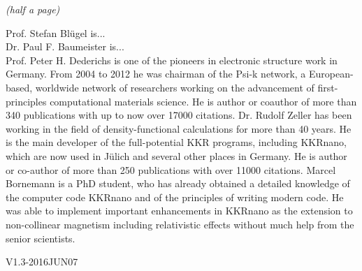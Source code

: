 \documentclass [a4paper, 12pt]{article}
\begin{document}
\textit{(half a page)}

Prof. Stefan Bl{\"u}gel is...
\\
Dr. Paul F. Baumeister is...
\\
Prof. Peter H. Dederichs is one of the pioneers in electronic structure work in Germany.
From 2004 to 2012 he was chairman of the Psi-k network, a European-based, worldwide network 
of researchers working on the advancement of first-principles computational materials science.
He is author or coauthor of more than 340 publications with up to now over 17000 citations.
Dr. Rudolf Zeller has been working in the field of density-functional calculations for more than 40 years. 
He is the main developer of the full-potential KKR programs, including KKRnano, 
which are now used in J{\"u}lich and several other places in Germany. He is author or co-author of more 
than 250 publications with over 11000 citations. Marcel Bornemann is a PhD student, who has already
obtained a detailed knowledge of the computer code KKRnano and of the principles of writing modern code. 
He was able to implement important enhancements in KKRnano as the extension to non-collinear
magnetism including relativistic effects without much help from the senior scientists.
\newpage




\bigskip
\begin{flushright}
{\tiny V1.3-2016JUN07}
\end{flushright}
\end{document}
